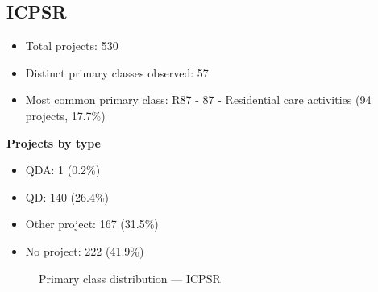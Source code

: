 \subsection{ICPSR}

\begin{itemize}
    \item Total projects: 530
    \item Distinct primary classes observed: 57
    \item Most common primary class: R87 - 87 - Residential care activities (94 projects, 17.7\%)
\end{itemize}
\textbf{Projects by type}
\begin{itemize}
    \item QDA: 1 (0.2\%)
    \item QD: 140 (26.4\%)
    \item Other project: 167 (31.5\%)
    \item No project: 222 (41.9\%)
\end{itemize}

\begin{figure}[H]
    \centering
    
    \caption{Primary class distribution --- ICPSR}
\end{figure}

